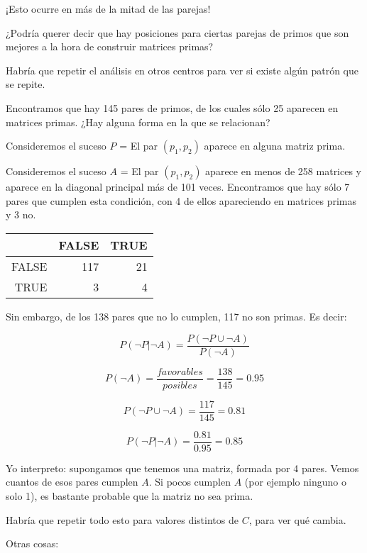 ¡Esto ocurre en más de la mitad de las parejas!

¿Podría querer decir que hay posiciones para ciertas parejas de primos que son mejores a la hora de construir matrices primas?

Habría que repetir el análisis en otros centros para ver si existe algún patrón que se repite.

\newpage
{}


Encontramos que hay 145 pares de primos, de los cuales sólo 25 aparecen en matrices primas. ¿Hay alguna forma en la que se relacionan?

Consideremos el suceso $P$ = El par $(p_1, p_2)$ aparece en alguna matriz prima.

Consideremos el suceso $A$ = El par $(p_1, p_2)$ aparece en menos de 258 matrices y aparece en la diagonal principal más de 101 veces. Encontramos que hay sólo 7 pares que cumplen esta condición, con 4 de ellos apareciendo en matrices primas y 3 no.

\begin{table}[ht]
\centering
\begin{tabular}{|r|rr|}
  \hline
 & FALSE & TRUE \\ 
  \hline
FALSE & 117 &  21 \\ 
  TRUE &   3 &   4 \\ 
   \hline
\end{tabular}
\end{table}

Sin embargo, de los 138 pares que no lo cumplen, 117 no son primas. Es decir:

$$P(\lnot P | \lnot A) = \frac{P(\lnot P \cup \lnot A)}{P(\lnot A)}$$

$$P(\lnot A) = \frac{favorables}{posibles} = \frac{138}{145} = 0.95$$

$$P(\lnot P \cup \lnot A) = \frac{117}{145} = 0.81 $$

$$P(\lnot P | \lnot A) = \frac{0.81}{0.95} = 0.85$$

Yo interpreto: supongamos que tenemos una matriz, formada por 4 pares. Vemos cuantos de esos pares cumplen $A$. Si pocos cumplen $A$ (por ejemplo ninguno o solo 1), es bastante probable que la matriz no sea prima.

Habría que repetir todo esto para valores distintos de $C$, para ver qué cambia.

Otras cosas:

